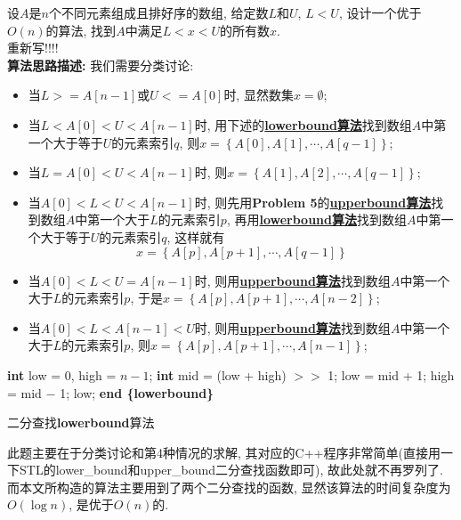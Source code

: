 \documentclass{article}
\begin{document}
\pagebreak

\begin{homeworkProblem}

	设$A$是$n$个不同元素组成且排好序的数组, 给定数$L$和$U$, $L<U$, 设计一个优于$O(n)$的算法, 找到$A$中满足$L<x<U$的所有数$x$.
	\\

	\solution 重新写!!!!
	\\

	\textbf{算法思路描述:} 我们需要分类讨论:
	\begin{itemize}
		\item 当$L>=A[n-1]$或$U<=A[0]$时, 显然数集$x=\emptyset$;
		\item 当$L<A[0]<U<A[n-1]$时, 用下述的\hyperref[alg:lowerbound算法]{\textbf{lowerbound算法}}找到数组$A$中第一个大于等于$U$的元素索引$q$, 则$x=\left\{ A\left[ 0 \right] ,A\left[ 1 \right] ,\cdots ,A\left[ q-1 \right] \right\}$; 
		\item 当$L=A[0]<U<A[n-1]$时, 则$x=\left\{ A\left[ 1 \right] ,A\left[ 2 \right] ,\cdots ,A\left[ q-1 \right] \right\}$;
		\item 当$A[0]<L<U<A[n-1]$时, 则先用\textbf{Problem 5}的\hyperref[alg:upperbound算法]{\textbf{upperbound算法}}找到数组$A$中第一个大于$L$的元素索引$p$, 再用\hyperref[alg:lowerbound算法]{\textbf{lowerbound算法}}找到数组$A$中第一个大于等于$U$的元素索引$q$, 这样就有$$x=\left\{ A\left[ p \right] ,A\left[ p+1 \right] ,\cdots ,A\left[ q-1 \right] \right\}$$
		\item 当$A\left[ 0 \right] <L<U=A\left[ n-1 \right] $时, 则用\hyperref[alg:upperbound算法]{\textbf{upperbound算法}}找到数组$A$中第一个大于$L$的元素索引$p$, 于是$x=\left\{ A\left[ p \right] ,A\left[ p+1 \right] ,\cdots ,A\left[ n-2 \right] \right\}$;
		\item 当$A\left[ 0 \right] <L<A\left[ n-1 \right] <U$时, 则用\hyperref[alg:upperbound算法]{\textbf{upperbound算法}}找到数组$A$中第一个大于$L$的元素索引$p$, 则$x=\left\{ A\left[ p \right] ,A\left[ p+1 \right] ,\cdots ,A\left[ n-1 \right] \right\}$;
	\end{itemize}
	  

	\begin{algorithm}[H]
		\begin{algorithmic}[1]
		\State \textbf{int} low = 0, high = $n - 1$;
			\State \textbf{int} mid = (low + high) $>>$ 1;
				\State low = mid + 1;
			\Else
				\State high = mid $-$ 1;
			\EndIf
		\EndWhile
		\State \Return low; 
		\State \textbf{end \{lowerbound\}}
		\end{algorithmic}
		\caption{二分查找\textbf{lowerbound}算法}
		\label{alg:lowerbound算法}
	\end{algorithm}
	此题主要在于分类讨论和第4种情况的求解, 其对应的C++程序非常简单(直接用一下STL的lower_bound和upper_bound二分查找函数即可), 故此处就不再罗列了. 而本文所构造的算法主要用到了两个二分查找的函数, 显然该算法的时间复杂度为$O(\log n)$, 是优于$O(n)$的.
\end{homeworkProblem}
\end{document}
